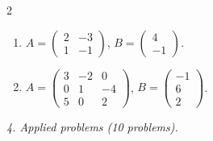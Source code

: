 \begin{multicols}{2}
\begin{enumerate}[label=\arabic*.,  leftmargin=*]
\item $A=\begin{pmatrix}2&-3\\1&-1\end{pmatrix}$, $B=\begin{pmatrix}4\\-1\end{pmatrix}$.
\item $A=\begin{pmatrix}3&-2&0\\0&1&-4\\5&0&2\end{pmatrix}$, $B=\begin{pmatrix}-1\\6\\2\end{pmatrix}$.
\end{enumerate}
\end{multicols}
\emph{4. Applied problems (10 problems).}
